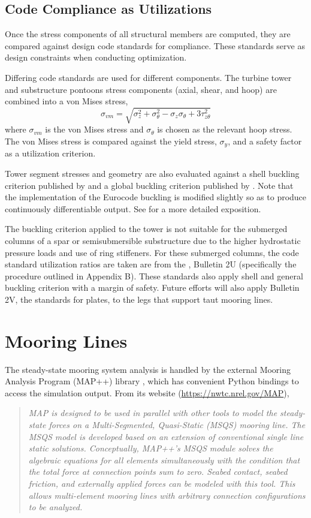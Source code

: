 \subsection{Code Compliance as Utilizations}
Once the stress components of all structural members are computed, they
are compared against design code standards for compliance.
These standards serve as design constraints when conducting optimization.

Differing code standards are used for different components.  The turbine
tower and substructure pontoons stress components (axial, shear, and
hoop) are combined into a von Mises stress, 
\[
  \sigma_{vm} = \sqrt{\sigma_z^2 + \sigma_{\theta}^2 -
    \sigma_z\sigma_{\theta} + 3\tau_{z\theta}^2}
\]
where $\sigma_{vm}$ is the von Mises stress and $\sigma_{\theta}$ is chosen
as the relevant hoop stress.  The von Mises stress is compared against
the yield stress, $\sigma_y$, and a safety factor as a utilization criterion.

Tower segment stresses and geometry are also evaluated against a shell
buckling criterion published by \citet{Eurocode} and a global buckling
criterion published by \citet{Germanischer}.  Note that the implementation of the
Eurocode buckling is modified slightly so as to produce continuously
differentiable output.  See \citet{JacketSE} for a more detailed
exposition.

The buckling criterion applied to the tower is not suitable for the
submerged columns of a spar or semisubmersible substructure due to the
higher hydrostatic pressure loads and use of ring stiffeners.  For these
submerged columns, the code standard utilization ratios are taken are
from the \citet{api2U}, Bulletin 2U (specifically the procedure outlined
in Appendix B).  These standards also apply shell and general buckling
criterion with a margin of safety.  Future efforts will also apply
Bulletin 2V, the standards for plates, to the legs that support taut
mooring lines.



\section{Mooring Lines}
The steady-state mooring system analysis is handled by the external Mooring Analysis
Program (MAP++) library \citep{MAP}, which has convenient Python bindings
to access the simulation output.  From its website
(\url{https://nwtc.nrel.gov/MAP}),
\begin{quote}
  \textit{MAP is designed to be used in parallel with other tools to model the
  steady-state forces on a Multi-Segmented, Quasi-Static (MSQS) mooring
  line. The MSQS model is developed based on an extension of
  conventional single line static solutions. Conceptually, MAP++'s MSQS
  module solves the algebraic equations for all elements simultaneously
  with the condition that the total force at connection points sum to
  zero. Seabed contact, seabed friction, and externally applied forces
  can be modeled with this tool. This allows multi-element mooring lines
  with arbitrary connection configurations to be analyzed.}
\end{quote}

